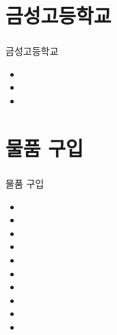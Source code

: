 \documentclass[aspectratio=1610,20pt,xcolor=pdftex,dvipsnames,table,handout]{beamer}
\begin{document}
		\section{금성고등학교}
		\begin{frame} [t,plain]
		\frametitle{}
			\begin{block} {금성고등학교}
			\setlength{\leftmargini}{1em}			
			\begin{itemize}
				\item 	\hrulefill
				\item 	\hrulefill
				\item 	\hrulefill
			\end{itemize}
			\end{block}						
		\end{frame}					

		\section{물품 구입}
		\begin{frame} [t,plain]
		\frametitle{}
			\begin{block} {물품 구입}
			\setlength{\leftmargini}{1em}			
			\begin{itemize}
				\item 	\hrulefill
				\item 	\hrulefill
				\item 	\hrulefill
				\item 	\hrulefill
				\item 	\hrulefill
				\item 	\hrulefill
				\item 	\hrulefill
				\item 	\hrulefill
				\item 	\hrulefill
				\item 	\hrulefill

			\end{itemize}
			\end{block}						
		\end{frame}					








\end{document}
